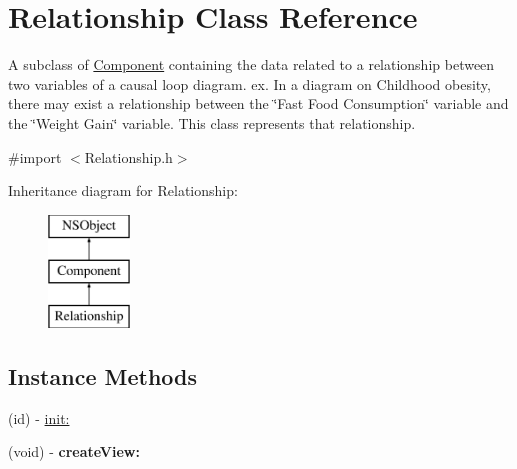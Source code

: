 \hypertarget{interface_relationship}{\section{Relationship Class Reference}
\label{interface_relationship}
}


A subclass of \hyperlink{interface_component}{Component} containing the data related to a relationship between two variables of a causal loop diagram. ex. In a diagram on Childhood obesity, there may exist a relationship between the \char`\"{}\-Fast Food Consumption\char`\"{} variable and the \char`\"{}\-Weight Gain\char`\"{} variable. This class represents that relationship.  




{\ttfamily \#import $<$Relationship.\-h$>$}

Inheritance diagram for Relationship\-:\begin{figure}[H]
\begin{center}
\leavevmode
\includegraphics[height=3.000000cm]{interface_relationship}
\end{center}
\end{figure}
\subsection*{Instance Methods}
\begin{DoxyCompactItemize}
\item 
(id) -\/ \hyperlink{interface_relationship_ae3fdc3a923d3d3be4b4aeb821cb90734}{init\-:}
\item 
\hypertarget{interface_relationship_a718cdfc549078ec1efb9b7ad284f823c}{(void) -\/ {\bfseries create\-View\-:}}\label{interface_relationship_a718cdfc549078ec1efb9b7ad284f823c}

\end{DoxyCompactItemize}
